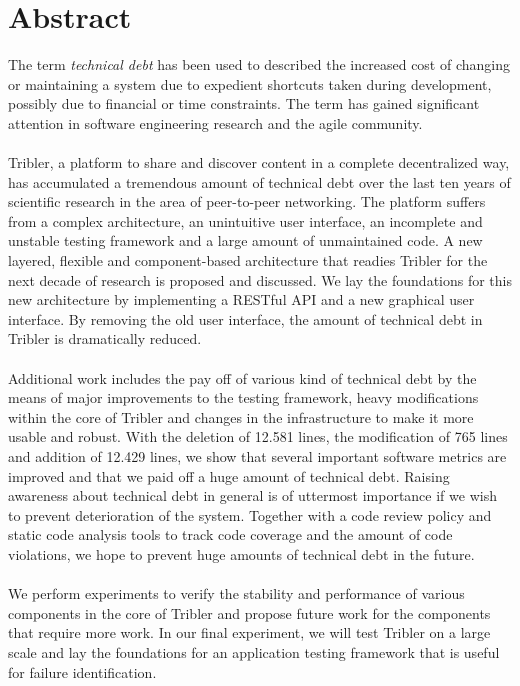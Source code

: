 \chapter*{Abstract}
The term \emph{technical debt} has been used to described the increased cost of changing or maintaining a system due to expedient shortcuts taken during development, possibly due to financial or time constraints. The term has gained significant attention in software engineering research and the agile community.\\\\
Tribler, a platform to share and discover content in a complete decentralized way, has accumulated a tremendous amount of technical debt over the last ten years of scientific research in the area of peer-to-peer networking.
The platform suffers from a complex architecture, an unintuitive user interface, an incomplete and unstable testing framework and a large amount of unmaintained code.
A new layered, flexible and component-based architecture that readies Tribler for the next decade of research is proposed and discussed.
We lay the foundations for this new architecture by implementing a RESTful API and a new graphical user interface. By removing the old user interface, the amount of technical debt in Tribler is dramatically reduced.\\\\
Additional work includes the pay off of various kind of technical debt by the means of major improvements to the testing framework, heavy modifications within the core of Tribler and changes in the infrastructure to make it more usable and robust.
With the deletion of 12.581 lines, the modification of 765 lines and addition of 12.429 lines, we show that several important software metrics are improved and that we paid off a huge amount of technical debt. 
Raising awareness about technical debt in general is of uttermost importance if we wish to prevent deterioration of the system.
Together with a code review policy and static code analysis tools to track code coverage and the amount of code violations, we hope to prevent huge amounts of technical debt in the future.\\\\
We perform experiments to verify the stability and performance of various components in the core of Tribler and propose future work for the components that require more work. In our final experiment, we will test Tribler on a large scale and lay the foundations for an application testing framework that is useful for failure identification.